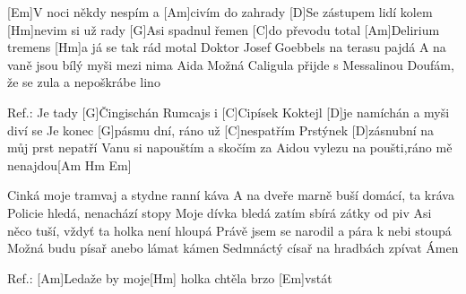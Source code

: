 
[Em]V noci někdy nespím a [Am]civím do zahrady
[D]Se zástupem lidí kolem [Hm]nevim si už rady
[G]Asi spadnul řemen [C]do převodu total
[Am]Delirium tremens [Hm]a já se tak rád motal
Doktor Josef Goebbels na terasu pajdá
A na vaně jsou bílý myši mezi nima Aida
Možná Caligula přijde s Messalinou
Doufám, že se zula a nepoškrábe lino

Ref.: Je tady [G]\null Čingischán Rumcajs i [C]Cipísek
Koktejl [D]je namíchán a myši diví se
Je konec [G]pásmu dní, ráno už [C]nespatřím
Prstýnek [D]zásnubní na můj prst nepatří
Vanu si napouštím a skočím za Aidou
vylezu na poušti,ráno mě nenajdou[Am Hm Em]

Cinká moje tramvaj a stydne ranní káva
A na dveře marně buší domácí, ta kráva
Policie hledá, nenachází stopy
Moje dívka bledá zatím sbírá zátky od piv
Asi něco tuší, vždyť ta holka není hloupá
Právě jsem se narodil a pára k nebi stoupá
Možná budu písař anebo lámat kámen
Sedmnáctý císař na hradbách zpívat Ámen

Ref.: 
[Am]Ledaže by moje[Hm] holka chtěla brzo [Em]vstát
